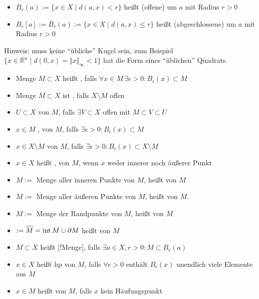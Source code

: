 \begin{*definition}
    \begin{itemize}
    \item $B_r(a):=\{ x\in X \mid d(a,x) < r \}$ heißt (offene)  um $a$ mit Radius $r > 0$
    \item $B_r[a]:=\bar{B}_r(a):=\{ x\in X \mid d(a,x) \le r \}$ heißt (abgeschlossene)  um $a$ mit Radius $r > 0$
    \end{itemize}
    Hinweis: muss keine "`übliche"' Kugel sein, zum Beispiel $\{ x\in \mathbb{R}^n \mid d(0,x) = \Vert x\Vert_{\infty} < 1 \}$ hat die Form eines "`üblichen"' Quadrats.
    \begin{itemize}
        \item Menge $M\subset X$ heißt , falls $\forall x\in M\,\exists \epsilon > 0: B_\epsilon(x) \subset M$
        \item Menge $M\subset X$ ist , falls $X\setminus M$ offen
        \item $U\subset X$  von $M$, falls $\exists V\subset X$ offen mit $M\subset V\subset U$
        \item $x\in M$ , von $M$, falls $\exists \epsilon > 0: B_\epsilon(x)\subset M$
        \item $x\in X\setminus M$  von $M$, falls $\exists \epsilon > 0: B_\epsilon(x)\subset X\setminus M$
        \item $x\in X$ heißt , von $M$, wenn $x$ weder innerer noch äußerer Punkt
        \item {}$ M:=$ Menge aller inneren Punkte von $M$, heißt  von $M$
        \item {}$M:=$ Menge aller äußeren Punkte von $M$, heißt  von $M$.
        \item {}$M:=$ Menge der Randpunkte von $M$, heißt  von $M$
        \item {}$:=\overline{M} = \Int M \cup \partial M$ heißt  von $M$
        \item $M\subset X$ heißt [!Menge], falls $\exists a\in X, r>0: M\subset B_r(a)$
        \item $x\in X$ heißt \gls{hp} von $M$, falls $\forall \epsilon > 0$ enthält $B_\epsilon(x)$ unendlich viele Elemente aus $M$
        \item $x\in M$ heißt  von $M$, falls $x$ kein Häufungspunkt
        \end{itemize}
\end{*definition}

